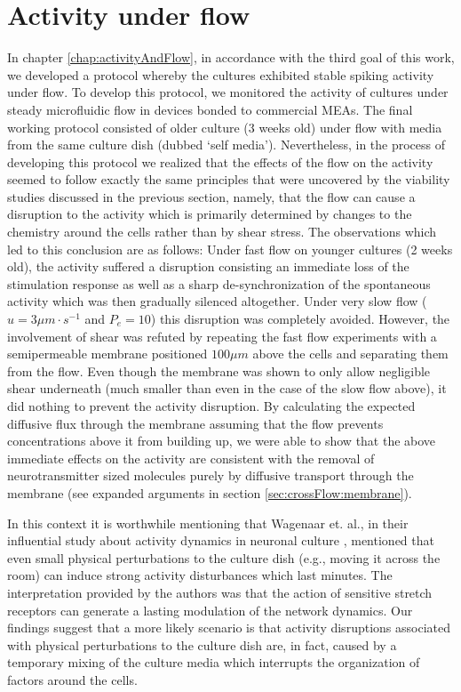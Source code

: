 \section{Activity under flow}
In chapter \ref{chap:activityAndFlow}, in accordance with the third goal of this work, we developed a protocol whereby the cultures exhibited stable spiking activity under flow. To develop this protocol, we monitored the activity of cultures under steady microfluidic flow in devices bonded to commercial MEAs. The final working protocol consisted of older culture (3 weeks old) under flow with media from the same culture dish (dubbed `self media'). Nevertheless, in the process of developing this protocol we realized that the effects of the flow on the activity seemed to follow exactly the same principles that were uncovered by the viability studies discussed in the previous section, namely, that the flow can cause a disruption to the activity which is primarily determined by changes to the chemistry around the cells rather than by shear stress. The observations which led to this conclusion are as follows: Under fast flow on younger cultures (2 weeks old), the activity suffered a disruption consisting an immediate loss of the stimulation response as well as a sharp de-synchronization of the spontaneous activity which was then gradually silenced altogether. Under very slow flow (\(u=3 \mu m\cdot s^{-1}\) and \(P_{e}=10\)) this disruption was completely avoided. However, the involvement of shear was refuted by repeating the fast flow experiments with a semipermeable membrane positioned \(100\mu m\) above the cells and separating them from the flow. Even though the membrane was shown to only allow negligible shear underneath (much smaller than even in the case of the slow flow above), it did nothing to prevent the activity disruption. By calculating the expected diffusive flux through the membrane assuming that the flow prevents concentrations above it from building up, we were able to show that the above immediate effects on the activity are consistent with the removal of neurotransmitter sized molecules purely by diffusive transport through the membrane (see expanded arguments in section \ref{sec:crossFlow:membrane}).

In this context it is worthwhile mentioning that Wagenaar et. al., in their influential study about activity dynamics in neuronal culture \cite{wagenaar2006extremely}, mentioned that even small physical perturbations to the culture dish (e.g., moving it across the room) can induce strong activity disturbances which last minutes. The interpretation provided by the authors was that the action of sensitive stretch receptors can generate a lasting modulation of the network dynamics. Our findings suggest that a more likely scenario is that activity disruptions associated with physical perturbations to the culture dish are, in fact, caused by a temporary mixing of the culture media which interrupts the organization of factors around the cells.


